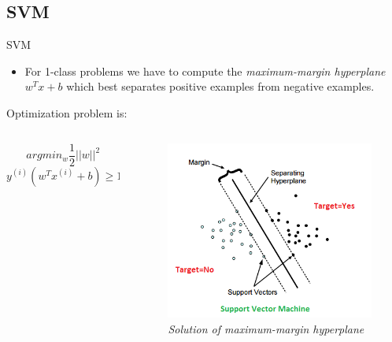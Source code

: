 \subsection{SVM}
\begin{frame}{SVM}
	\begin{itemize}\setlength\itemsep{1em}
		\item For 1-class problems we have to compute the \textit{maximum-margin hyperplane} $w^Tx + b$ which best separates positive examples from negative examples.
	\end{itemize}
	Optimization problem is:
	\begin{columns}
		\begin{column}{0.5\textwidth}\centering
			$$arg min_w \frac{1}{2} ||w||^2$$
			$$y^{(i)} (w^T x^{(i)} + b) \geq 1 \ \forall i \in [1, n]$$
		\end{column}
		\begin{column}{0.5\textwidth}\centering
			\begin{figure}[htbp]
				\centering
				\includegraphics[scale = 0.40]{./images/optimal-hyperplane2.png}
				\caption{\textit{Solution of maximum-margin hyperplane}}
			\end{figure}
		\end{column}
	\end{columns}
	
	
	
\end{frame}

